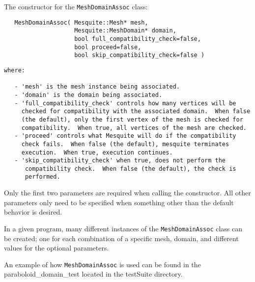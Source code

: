   The constructor for the \texttt{MeshDomainAssoc} class:

\begin{lstlisting}
   MeshDomainAssoc( Mesquite::Mesh* mesh, 
                    Mesquite::MeshDomain* domain, 
                    bool full_compatibility_check=false,
                    bool proceed=false,
                    bool skip_compatibility_check=false )
\end{lstlisting}

\begin{verbatim}
where:

   - 'mesh' is the mesh instance being associated.
   - 'domain' is the domain being associated.
   - 'full_compatibility_check' controls how many vertices will be 
     checked for compatibility with the associated domain.  When false 
     (the default), only the first vertex of the mesh is checked for
     compatibility.  When true, all vertices of the mesh are checked.
   - 'proceed' controls what Mesquite will do if the compatibility
     check fails.  When false (the default), mesquite terminates
     execution.  When true, execution continues.
   - 'skip_compatibility_check' when true, does not perform the
      compatibility check.  When false (the default), the check is 
      performed.
\end{verbatim}

Only the first two parameters are required when calling the constructor.  All other parameters only need to be specified when something other than the default behavior is desired.

 In a given program, many different instances of the \texttt{MeshDomainAssoc} class can be created; one for each combination of a specific mesh, domain, and different values for the optional parameters.

An example of how \texttt{MeshDomainAssoc} is used can be found in the paraboloid\_domain\_test located in the testSuite directory.


